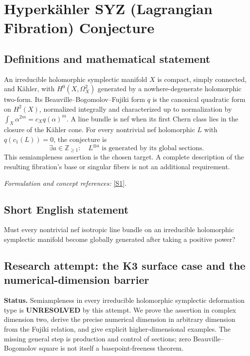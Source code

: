 \documentclass[11pt]{article}
\begin{document}
\section*{\texorpdfstring{Hyperkähler SYZ (Lagrangian Fibration) Conjecture}{Hyperkähler SYZ (Lagrangian Fibration) Conjecture}}\label{30006891}
\subsection{Definitions and mathematical statement}
An irreducible holomorphic symplectic manifold $X$ is compact, simply connected, and K\"ahler, with $H^0(X,\Omega_X^2)$ generated by a nowhere-degenerate holomorphic two-form. Its Beauville--Bogomolov--Fujiki form $q$ is the canonical quadratic form on $H^2(X)$, normalized integrally and characterized up to normalization by $\int_X\alpha^{2m}=c_Xq(\alpha)^m$. A line bundle is nef when its first Chern class lies in the closure of the K\"ahler cone. For every nontrivial nef holomorphic $L$ with $q(c_1(L))=0$, the conjecture is
\[
 \exists a\in{\mathbb{Z}}_{\ge1}:\quad L^{\otimes a}
 \text{ is generated by its global sections}.
\]
This semiampleness assertion is the chosen target. A complete description of the resulting fibration's base or singular fibers is not an additional requirement.
\par\smallskip\textit{Formulation and concept references:} \href{https://epiga.episciences.org/17061/pdf}{[S1]}.

\subsection{Short English statement}
Must every nontrivial nef isotropic line bundle on an irreducible holomorphic symplectic manifold become globally generated after taking a positive power?
\subsection{Research attempt: the K3 surface case and the numerical-dimension barrier}
\textbf{Status.} Semiampleness in every irreducible holomorphic symplectic deformation type is \textbf{UNRESOLVED} by this attempt. We prove the assertion in complex dimension two, derive the precise numerical dimension in arbitrary dimension from the Fujiki relation, and give explicit higher-dimensional examples. The missing general step is production and control of sections; zero Beauville--Bogomolov square is not itself a basepoint-freeness theorem.
\end{document}
